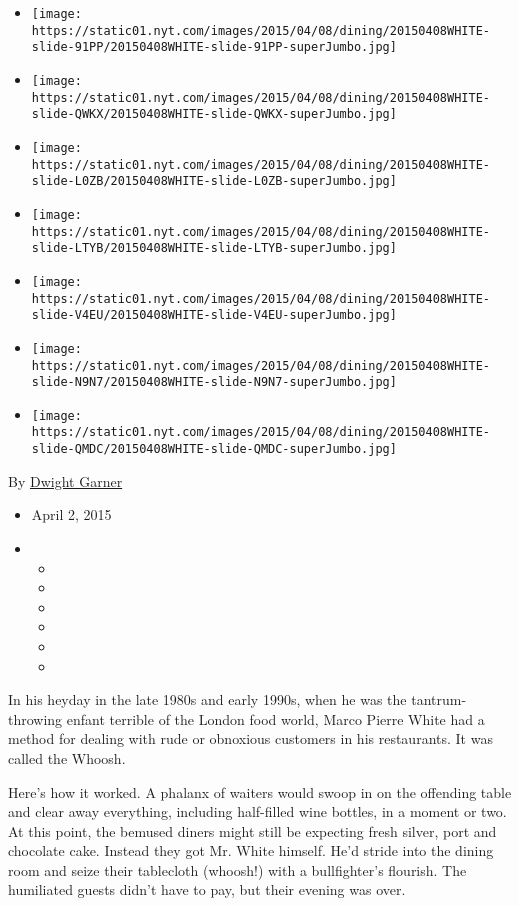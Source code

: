 \begin{itemize}
\item
  \texttt{[image: https://static01.nyt.com/images/2015/04/08/dining/20150408WHITE-slide-91PP/20150408WHITE-slide-91PP-superJumbo.jpg]}
\item
  \texttt{[image: https://static01.nyt.com/images/2015/04/08/dining/20150408WHITE-slide-QWKX/20150408WHITE-slide-QWKX-superJumbo.jpg]}
\item
  \texttt{[image: https://static01.nyt.com/images/2015/04/08/dining/20150408WHITE-slide-L0ZB/20150408WHITE-slide-L0ZB-superJumbo.jpg]}
\item
  \texttt{[image: https://static01.nyt.com/images/2015/04/08/dining/20150408WHITE-slide-LTYB/20150408WHITE-slide-LTYB-superJumbo.jpg]}
\item
  \texttt{[image: https://static01.nyt.com/images/2015/04/08/dining/20150408WHITE-slide-V4EU/20150408WHITE-slide-V4EU-superJumbo.jpg]}
\item
  \texttt{[image: https://static01.nyt.com/images/2015/04/08/dining/20150408WHITE-slide-N9N7/20150408WHITE-slide-N9N7-superJumbo.jpg]}
\item
  \texttt{[image: https://static01.nyt.com/images/2015/04/08/dining/20150408WHITE-slide-QMDC/20150408WHITE-slide-QMDC-superJumbo.jpg]}
\end{itemize}

By \href{http://www.nytimes.com/by/dwight-garner}{Dwight Garner}

\begin{itemize}
\item
  April 2, 2015
\item
  \begin{itemize}
  \item
  \item
  \item
  \item
  \item
  \item
  \end{itemize}
\end{itemize}

In his heyday in the late 1980s and early 1990s, when he was the
tantrum-throwing enfant terrible of the London food world, Marco Pierre
White had a method for dealing with rude or obnoxious customers in his
restaurants. It was called the Whoosh.

Here's how it worked. A phalanx of waiters would swoop in on the
offending table and clear away everything, including half-filled wine
bottles, in a moment or two. At this point, the bemused diners might
still be expecting fresh silver, port and chocolate cake. Instead they
got Mr. White himself. He'd stride into the dining room and seize their
tablecloth (whoosh!) with a bullfighter's flourish. The humiliated
guests didn't have to pay, but their evening was over.

